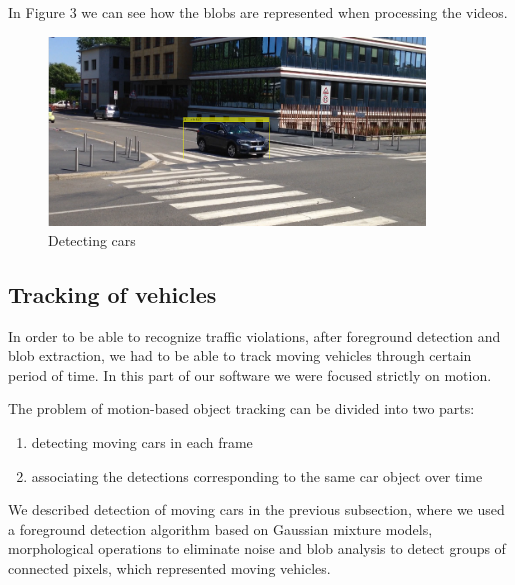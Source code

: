\documentclass[12pt]{article} %
\begin{document}
In Figure 3 we can see how the blobs are represented when processing the videos.
\begin{figure}[ht]
\centering
\includegraphics[width=10cm]{images/tracking.png}
\caption{Detecting cars}
\end{figure}

\subsection{Tracking of vehicles}

In order to be able to recognize traffic violations, after foreground detection and blob extraction, we had to be able to track moving vehicles through certain period of time. In this part of our software we were focused strictly on motion.

The problem of motion-based object tracking can be divided into two parts:

\begin{enumerate}
\item detecting moving cars in each frame
\item associating the detections corresponding to the same car object over time
\end{enumerate}

We described detection of moving cars in the previous subsection, where we used a foreground detection algorithm based on Gaussian mixture models, morphological operations to eliminate noise and blob analysis to detect groups of connected pixels, which represented moving vehicles.
\end{document}
